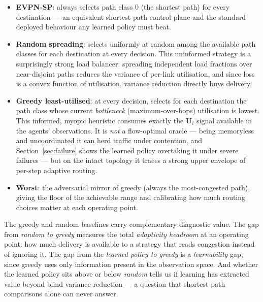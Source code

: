 \documentclass[10pt,journal,comsoc]{IEEEtran}
\begin{document}
\begin{itemize}
  \item \textbf{EVPN-SP}: always selects path class $0$ (the shortest path) for every destination --- an equivalent shortest-path control plane and the standard deployed behaviour any learned policy must beat.
  \item \textbf{Random spreading}: selects uniformly at random among the available path classes for each destination at every decision. This uninformed strategy is a surprisingly strong load balancer: spreading independent load fractions over near-disjoint paths reduces the variance of per-link utilisation, and since loss is a convex function of utilisation, variance reduction directly buys delivery.
  \item \textbf{Greedy least-utilised}: at every decision, selects for each destination the path class whose current \emph{bottleneck} (maximum-over-hops) utilisation is lowest. This informed, myopic heuristic consumes exactly the $\mathbf{U}_i$ signal available in the agents' observations. It is \emph{not} a flow-optimal oracle --- being memoryless and uncoordinated it can herd traffic under contention, and Section~\ref{sec:failure} shows the learned policy overtaking it under severe failures --- but on the intact topology it traces a strong upper envelope of per-step adaptive routing.
  \item \textbf{Worst}: the adversarial mirror of greedy (always the most-congested path), giving the floor of the achievable range and calibrating how much routing choices matter at each operating point.
\end{itemize}

The greedy and random baselines carry complementary diagnostic value. The gap from \emph{random to greedy} measures the total \emph{adaptivity headroom} at an operating point: how much delivery is available to a strategy that reads congestion instead of ignoring it. The gap from the \emph{learned policy to greedy} is a \emph{learnability} gap, since greedy uses only information present in the observation space. And whether the learned policy sits above or below \emph{random} tells us if learning has extracted value beyond blind variance reduction --- a question that shortest-path comparisons alone can never answer.
\end{document}

